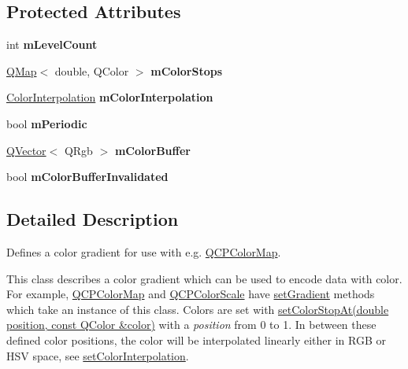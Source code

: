 \subsection*{Protected Attributes}
\begin{DoxyCompactItemize}
\item 
int {\bfseries m\+Level\+Count}\hypertarget{class_q_c_p_color_gradient_a98fb68e359904b2c991fcae3e38a211a}{}\label{class_q_c_p_color_gradient_a98fb68e359904b2c991fcae3e38a211a}

\item 
\hyperlink{class_q_map}{Q\+Map}$<$ double, Q\+Color $>$ {\bfseries m\+Color\+Stops}\hypertarget{class_q_c_p_color_gradient_a9208f022592e3bc77241669b66422b6f}{}\label{class_q_c_p_color_gradient_a9208f022592e3bc77241669b66422b6f}

\item 
\hyperlink{class_q_c_p_color_gradient_ac5dca17cc24336e6ca176610e7f77fc1}{Color\+Interpolation} {\bfseries m\+Color\+Interpolation}\hypertarget{class_q_c_p_color_gradient_a028cef73d863800a9ee93ffd641cce01}{}\label{class_q_c_p_color_gradient_a028cef73d863800a9ee93ffd641cce01}

\item 
bool {\bfseries m\+Periodic}\hypertarget{class_q_c_p_color_gradient_a4b07deeb20ca1ee2d5ea7e01bf0420af}{}\label{class_q_c_p_color_gradient_a4b07deeb20ca1ee2d5ea7e01bf0420af}

\item 
\hyperlink{class_q_vector}{Q\+Vector}$<$ Q\+Rgb $>$ {\bfseries m\+Color\+Buffer}\hypertarget{class_q_c_p_color_gradient_ad554625b4812f46679b180a5a2ea93fd}{}\label{class_q_c_p_color_gradient_ad554625b4812f46679b180a5a2ea93fd}

\item 
bool {\bfseries m\+Color\+Buffer\+Invalidated}\hypertarget{class_q_c_p_color_gradient_abacf55e11f67d6722a687af1bb2687bd}{}\label{class_q_c_p_color_gradient_abacf55e11f67d6722a687af1bb2687bd}

\end{DoxyCompactItemize}


\subsection{Detailed Description}
Defines a color gradient for use with e.\+g. \hyperlink{class_q_c_p_color_map}{Q\+C\+P\+Color\+Map}. 

This class describes a color gradient which can be used to encode data with color. For example, \hyperlink{class_q_c_p_color_map}{Q\+C\+P\+Color\+Map} and \hyperlink{class_q_c_p_color_scale}{Q\+C\+P\+Color\+Scale} have \hyperlink{class_q_c_p_color_map_a7313c78360471cead3576341a2c50377}{set\+Gradient} methods which take an instance of this class. Colors are set with \hyperlink{class_q_c_p_color_gradient_a3b48be5e78079db1bb2a1188a4c3390e}{set\+Color\+Stop\+At(double position, const Q\+Color \&color)} with a {\itshape position} from 0 to 1. In between these defined color positions, the color will be interpolated linearly either in R\+GB or H\+SV space, see \hyperlink{class_q_c_p_color_gradient_aa13fda86406e1d896a465a409ae63b38}{set\+Color\+Interpolation}.

